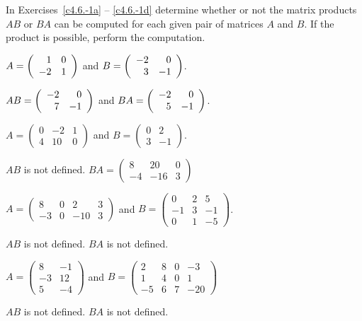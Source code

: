 \documentclass{ximera}
\begin{document}
\noindent In Exercises~\ref{c4.6.-1a} -- \ref{c4.6.-1d} determine whether or 
not the matrix products $AB$ or $BA$ can be computed for each given pair of 
matrices $A$ and $B$.  If the product is possible, perform the computation.
\begin{exercise}  \label{c4.6.-1a}
$A=\left(\begin{array}{rr} 1 & 0\\ -2 &1\end{array}\right)$ and $B=\left(\begin{array}{rr} -2 & 0\\ 3 &-1\end{array}\right)$.

\begin{solution}
$AB=\left(\begin{array}{rr} -2 & 0\\ 7 &-1\end{array}\right)$ and $BA= \left(\begin{array}{rr} -2 & 0\\ 5 &-1\end{array}\right)$.

\end{solution}
\end{exercise}
\begin{exercise}  \label{c4.6.-1b}
$A=\left(\begin{array}{rrr} 0 & -2 & 1\\ 4 & 10 & 0 \end{array}\right)$
and $B=\left(\begin{array}{rr} 0 & 2 \\ 3 & -1 \end{array}\right)$.

\begin{solution}
$AB$ is not defined. $BA=\left(\begin{array}{rrr} 8 &  20 &  0\\
 -4 & -16  &  3\end{array}\right)$


\end{solution}
\end{exercise}
\begin{exercise}  \label{c4.6.-1c}
$A=\left(\begin{array}{rrrr} 8 & 0 & 2 & 3\\ -3 & 0 & -10 &
3\end{array}\right)$
and $B=\left(\begin{array}{rrr} 0 & 2 & 5\\ -1 & 3 & -1 \\ 0 & 1 &
-5\end{array}\right)$.

\begin{solution}
$AB$ is not defined. $BA$  is not defined.  

\end{solution}
\end{exercise}
\begin{exercise}  \label{c4.6.-1d}
$A=\left(\begin{array}{rr} 8 & -1 \\ -3 & 12 \\ 5 & -4\end{array}\right)$
and $B=\left(\begin{array}{rrrr} 2 & 8 & 0 & -3\\ 1 & 4 & 0 & 1\\
-5 & 6 & 7 & -20\end{array}\right)$

\begin{solution}
$AB$ is not defined. $BA$  is not defined.


\end{solution}
\end{exercise}
\end{document}
